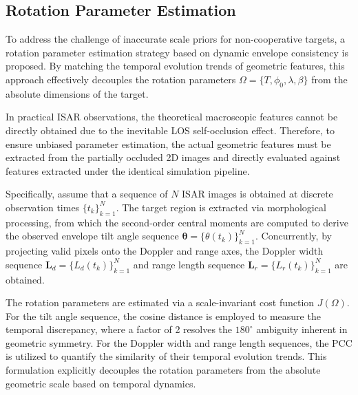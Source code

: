 \documentclass[conference]{IEEEtran}
\begin{document}
\subsection{Rotation Parameter Estimation}\label{Rotation}

To address the challenge of inaccurate scale priors for non-cooperative targets, a rotation parameter estimation strategy based on dynamic envelope consistency is proposed. By matching the temporal evolution trends of geometric features, this approach effectively decouples the rotation parameters $\Omega = \{T, \phi_0, \lambda, \beta\}$ from the absolute dimensions of the target.

In practical ISAR observations, the theoretical macroscopic features cannot be directly obtained due to the inevitable LOS self-occlusion effect. Therefore, to ensure unbiased parameter estimation, the actual geometric features must be extracted from the partially occluded 2D images and directly evaluated against features extracted under the identical simulation pipeline.

Specifically, assume that a sequence of $N$ ISAR images is obtained at discrete observation times $\{t_k\}_{k=1}^N$. The target region is extracted via morphological processing, from which the second-order central moments are computed to derive the observed envelope tilt angle sequence $\boldsymbol{\theta} = \{\theta(t_k)\}_{k=1}^N$. Concurrently, by projecting valid pixels onto the Doppler and range axes, the Doppler width sequence $\mathbf{L}_d = \{L_d(t_k)\}_{k=1}^N$ and range length sequence $\mathbf{L}_r = \{L_r(t_k)\}_{k=1}^N$ are obtained.

The rotation parameters are estimated via a scale-invariant cost function $J(\Omega)$. For the tilt angle sequence, the cosine distance is employed to measure the temporal discrepancy, where a factor of 2 resolves the $180^\circ$ ambiguity inherent in geometric symmetry. For the Doppler width and range length sequences, the PCC is utilized to quantify the similarity of their temporal evolution trends. This formulation explicitly decouples the rotation parameters from the absolute geometric scale based on temporal dynamics.
\end{document}
